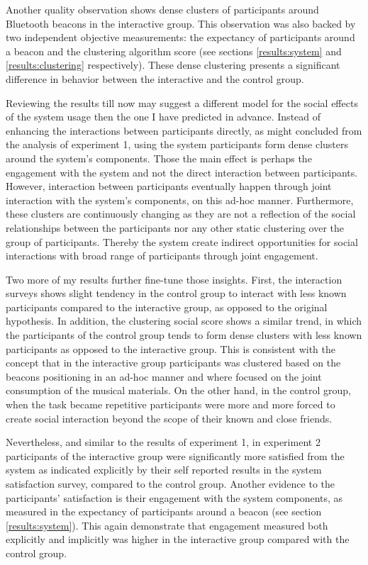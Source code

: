 \documentclass[a4paper,11pt]{article}
\begin{document}
{Another quality observation shows dense clusters of participants around Bluetooth beacons in the interactive group.
This observation was also backed by two independent objective measurements: the expectancy of participants around a beacon and the clustering algorithm score (see sections \ref{results:system} and \ref{results:clustering} respectively).
These dense clustering presents a significant difference in behavior between the interactive and the control group.

Reviewing the results till now may suggest a different model for the social effects of the system usage then the one I have predicted in advance.
Instead of enhancing the interactions between participants directly, as might concluded from the analysis of experiment 1, using the system participants form dense clusters around the system's components.
Those the main effect is perhaps the engagement with the system and not the direct interaction between participants.
However, interaction between participants eventually happen through joint interaction with the system's components, on this ad-hoc manner.
Furthermore, these clusters are continuously changing as they are not a reflection of the social relationships between the participants nor any other static clustering over the group of participants.
Thereby the system create indirect opportunities for social interactions with broad range of participants through joint engagement.

Two more of my results further fine-tune those insights.
First, the interaction surveys shows slight tendency in the control group to interact with less known participants compared to the interactive group, as opposed to the original hypothesis.
In addition, the clustering social score shows a similar trend, in which the participants of the control group tends to form dense clusters with less known participants as opposed to the interactive group.
This is consistent with the concept that in the interactive group participants was clustered based on the beacons positioning in an ad-hoc manner and where focused on the joint consumption of the musical materials.
On the other hand, in the control group, when the task became repetitive participants were more and more forced to create social interaction beyond the scope of their known and close friends.

Nevertheless, and similar to the results of experiment 1, in experiment 2 participants of the interactive group were significantly more satisfied from the system as indicated explicitly by their self reported results in the system satisfaction survey, compared to the control group.
Another evidence to the participants' satisfaction is their engagement with the system components, as measured in the expectancy of participants around a beacon (see section \ref{results:system}).
This again demonstrate that engagement measured both explicitly and implicitly was higher in the interactive group compared with the control group.

}
\end{document}
